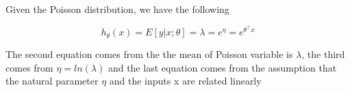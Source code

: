 \begin{answer}

Given the Poisson distribution, we have the following

\begin{equation}
    h_\theta(x) = E\left[y|x;\theta\right] = \lambda = e^\eta = e^{\theta^\top x}
\end{equation}

The second equation comes from the the mean of Poisson variable is $\lambda$, the third comes from $\eta = ln(\lambda)$ and the last equation comes from the assumption that the natural parameter $\eta$ and the inputs x are related linearly
\end{answer}
